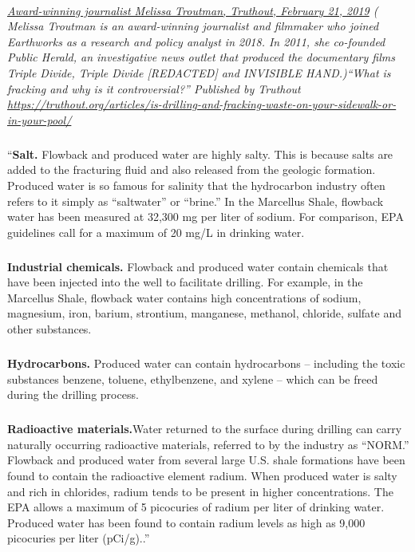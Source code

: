 \documentclass{article}
\begin{document}
\paragraph{}
\small
\textit{
\underline{Award-winning journalist Melissa Troutman, Truthout, February 21, 2019}
( Melissa Troutman is an award-winning journalist and filmmaker who joined Earthworks as a research and policy analyst in 2018. In 2011, she co-founded Public Herald, an investigative news outlet that produced the documentary films Triple Divide, Triple Divide [REDACTED] and INVISIBLE HAND.)``What is fracking and why is it controversial?'' Published by Truthout
\url{https://truthout.org/articles/is-drilling-and-fracking-waste-on-your-sidewalk-or-in-your-pool/}}
\normalsize
\subparagraph{}
``\textbf{Salt.} Flowback and produced water are highly salty. This is because salts are added to the fracturing fluid and also released from the geologic formation. Produced water is so famous for salinity that the hydrocarbon industry often refers to it simply as “saltwater” or “brine.” In the Marcellus Shale, flowback water has been measured at 32,300 mg per liter of sodium. For comparison, EPA guidelines call for a maximum of 20 mg/L in drinking water.
\subparagraph{}
\textbf{Industrial chemicals.} Flowback and produced water contain chemicals that have been injected into the well to facilitate drilling. For example, in the Marcellus Shale, flowback water contains high concentrations of sodium, magnesium, iron, barium, strontium, manganese, methanol, chloride, sulfate and other substances.
\subparagraph{}
\textbf{Hydrocarbons.} Produced water can contain hydrocarbons -- including the toxic substances benzene, toluene, ethylbenzene, and xylene – which can be freed during the drilling process.
\subparagraph{}
\textbf{Radioactive materials.}Water returned to the surface during drilling can carry naturally occurring radioactive materials, referred to by the industry as “NORM.” Flowback and produced water from several large U.S. shale formations have been found to contain the radioactive element radium. When produced water is salty and rich in chlorides, radium tends to be present in higher concentrations.
The EPA allows a maximum of 5 picocuries of radium per liter of drinking water. Produced water has been found to contain radium levels as high as 9,000 picocuries per liter (pCi/g)..”
\end{document}
